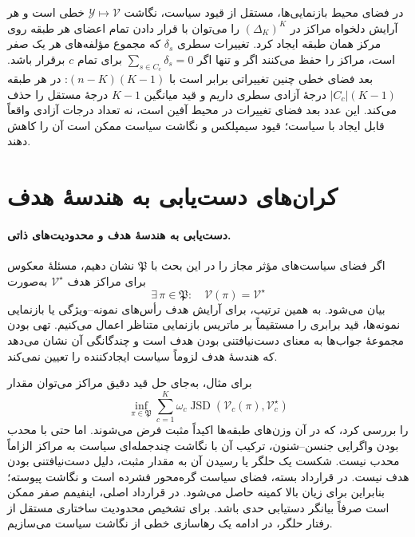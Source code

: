 در فضای محیط بازنمایی‌ها، مستقل از قیود سیاست، نگاشت $\mathscr Y\mapsto\mathcal V$ خطی است و هر آرایش دلخواه مراکز در $(\Delta_K)^K$ را می‌توان با قرار دادن تمام اعضای هر طبقه روی مرکز همان طبقه ایجاد کرد. تغییرات سطری $\delta_s$ که مجموع مؤلفه‌های هر یک صفر است، مراکز را حفظ می‌کنند اگر و تنها اگر $\sum_{s\in C_c}\delta_s=0$ برای تمام $c$ برقرار باشد. بعد فضای خطی چنین تغییراتی برابر است با $(n-K)(K-1)$: در هر طبقه $|C_c|(K-1)$ درجهٔ آزادی سطری داریم و قید میانگین $K-1$ درجهٔ مستقل را حذف می‌کند. این عدد بعد فضای تغییرات در محیط آفین است، نه تعداد درجات آزادی واقعاً قابل ایجاد با سیاست؛ قیود سیمپلکس و نگاشت سیاست ممکن است آن را کاهش دهند.


\section{کران‌های دست‌یابی به هندسهٔ هدف}
\label{app:geometry-policy-attainability}

\paragraph{دست‌یابی به هندسهٔ هدف و محدودیت‌های ذاتی.}
اگر فضای سیاست‌های مؤثر مجاز را در این بحث با $\mathfrak P$ نشان دهیم، مسئلهٔ معکوس برای مراکز هدف $\mathcal V^\star$ به‌صورت
\begin{equation}\label{cmp:eq:ch3-geometry-target-feasibility}
\exists\,\pi\in\mathfrak P:\quad \mathcal V(\pi)=\mathcal V^\star
\end{equation}
بیان می‌شود. به همین ترتیب، برای آرایش هدف رأس‌های نمونه--ویژگی یا بازنمایی نمونه‌ها، قید برابری را مستقیماً بر ماتریس بازنمایی متناظر اعمال می‌کنیم. تهی بودن مجموعهٔ جواب‌ها به معنای دست‌نیافتنی بودن هدف است و چندگانگی آن نشان می‌دهد که هندسهٔ هدف لزوماً سیاست ایجادکننده را تعیین نمی‌کند.

برای مثال، به‌جای حل قید دقیق مراکز می‌توان مقدار
\begin{equation}\label{cmp:eq:ch3-geometry-inverse-infimum}
\inf_{\pi\in\mathfrak P}\sum_{c=1}^K\omega_c\operatorname{JSD}(\mathcal V_c(\pi),\mathcal V_c^\star)
\end{equation}
را بررسی کرد، که در آن وزن‌های طبقه‌ها اکیداً مثبت فرض می‌شوند. اما حتی با محدب بودن واگرایی جنسن--شنون، ترکیب آن با نگاشت چندجمله‌ای سیاست به مراکز الزاماً محدب نیست. شکست یک حلگر یا رسیدن آن به مقدار مثبت، دلیل دست‌نیافتنی بودن هدف نیست. در قرارداد بسته، فضای سیاست گره‌محور فشرده است و نگاشت پیوسته؛ بنابراین برای زیان بالا کمینه حاصل می‌شود. در قرارداد اصلی، اینفیمم صفر ممکن است صرفاً بیانگر دستیابی حدی باشد. برای تشخیص محدودیت ساختاری مستقل از رفتار حلگر، در ادامه یک رهاسازی خطی از نگاشت سیاست می‌سازیم.

